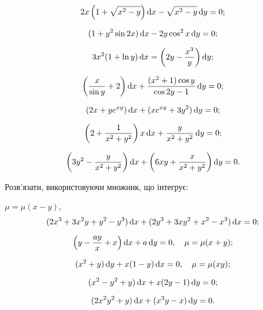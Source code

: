 \begin{problem}
	\[2x\left(1+\sqrt{x^2-y}\right)\mathop{}\!\mathrm{d} x-\sqrt{x^2-y}\mathop{}\!\mathrm{d} y=0;\]
\end{problem}

\begin{problem}
	\[(1+y^2\sin 2x)\mathop{}\!\mathrm{d} x-2y\cos^2x\mathop{}\!\mathrm{d} y=0;\]
\end{problem}

\begin{problem}
	\[3x^2(1+\ln y)\mathop{}\!\mathrm{d} x=\left(2y-\frac{x^3}y\right)\mathop{}\!\mathrm{d} y;\]
\end{problem}

\begin{problem}
	\[\left(\frac x{\sin y}+2\right)\mathop{}\!\mathrm{d} x+\frac{(x^2+1)\cos y}{\cos2y-1}\mathop{}\!\mathrm{d} y=0;\]
\end{problem}

\begin{problem}
	\[(2x+y e^{xy})\mathop{}\!\mathrm{d} x+(x e^{xy}+3y^2)\mathop{}\!\mathrm{d} y=0;\]
\end{problem}

\begin{problem}
	\[\left(2+\frac{1}{x^2+y^2}\right) x\mathop{}\!\mathrm{d} x+\frac{y}{x^2+y^2} \mathop{}\!\mathrm{d} y=0;\]
\end{problem}

\begin{problem}
	\[\left(3y^2-\frac{y}{x^2+y^2}\right)\mathop{}\!\mathrm{d} x+\left(6xy+\frac{x}{x^2+y^2}\right) \mathop{}\!\mathrm{d} y=0.\]
\end{problem}

Розв'язати, використовуючи множник, що інтегрує:
\begin{problem} $\mu=\mu(x-y)$,
	\[(2x^3+3x^2y+y^2-y^3)\mathop{}\!\mathrm{d} x+(2y^3+3xy^2+x^2-x^3)\mathop{}\!\mathrm{d} x=0;\]
\end{problem}

\begin{problem}
	\[ \left(y-\frac{ay}{x}+x\right)\mathop{}\!\mathrm{d} x+a\mathop{}\!\mathrm{d} y=0, \quad \mu=\mu(x+y);\]
\end{problem}

\begin{problem}
	\[(x^2+y)\mathop{}\!\mathrm{d} y+x(1-y)\mathop{}\!\mathrm{d} x=0, \quad \mu=\mu(xy);\]
\end{problem}

\begin{problem}
	\[(x^2-y^2+y)\mathop{}\!\mathrm{d} x+x(2y-1)\mathop{}\!\mathrm{d} y=0;\]
\end{problem}

\begin{problem}
	\[(2x^2y^2+y)\mathop{}\!\mathrm{d} x+(x^3y-x)\mathop{}\!\mathrm{d} y=0.\]
\end{problem}